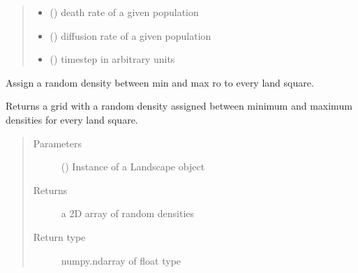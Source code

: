 \documentclass[letterpaper,10pt,english]{sphinxmanual}
\begin{document}
\begin{fulllineitems}
\begin{fulllineitems}
\begin{quote}
\begin{description}
\begin{itemize}
\item {} 
 () \textendash{} death rate of a given population

\item {} 
 () \textendash{} diffusion rate of a given population

\item {} 
 () \textendash{} timestep in arbitrary units

\end{itemize}

\end{description}\end{quote}

\end{fulllineitems}


\begin{fulllineitems}
\label{\detokenize{pumha:pumha.pop.Population.random_density}}
Assign a random density between min and max ro to every land square.

Returns a grid with a random density assigned
between minimum and maximum densities for every land square.
\begin{quote}\begin{description}
\item[{Parameters}] \leavevmode
{} ({\hyperref[\detokenize{pumha:pumha.env.Landscape}]{}}) \textendash{} Instance of a Landscape object

\item[{Returns}] \leavevmode
a 2D array of random densities

\item[{Return type}] \leavevmode
numpy.ndarray of float type

\end{description}\end{quote}

\end{fulllineitems}


\end{fulllineitems}

\end{document}
